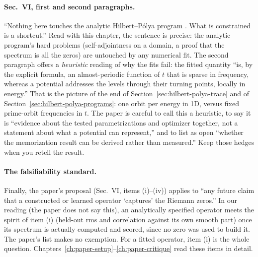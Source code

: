 \paragraph{Sec.~VI, first and second paragraphs.} ``Nothing here touches the analytic Hilbert--P\'olya program \cite{berrykeating99,connes,bbm,zetatriples,connes26}. What is constrained is a shortcut.'' Read with this chapter, the sentence is precise: the analytic program's hard problems (self-adjointness on a domain, a proof that the spectrum is all the zeros) are untouched by any numerical fit. The second paragraph offers a \emph{heuristic} reading of why the fits fail: the fitted quantity ``is, by the explicit formula, an almost-periodic function of $t$ that is sparse in frequency, whereas a potential addresses the levels through their turning points, locally in energy.'' That is the picture of the end of Section~\ref{sec:hilbert-polya-trace} and of Section~\ref{sec:hilbert-polya-programs}: one orbit per energy in 1D, versus fixed prime-orbit frequencies in $t$. The paper is careful to call this a heuristic, to say it is ``evidence about the tested parametrizations and optimizer together, not a statement about what a potential can represent,'' and to list as open ``whether the memorization result can be derived rather than measured.'' Keep those hedges when you retell the result.

\paragraph{The falsifiability standard.} Finally, the paper's proposal (Sec.~VI, items (i)--(iv)) applies to ``any future claim that a constructed or learned operator `captures' the Riemann zeros.'' In our reading (the paper does not say this), an analytically specified operator meets the spirit of item (i) (held-out rms and correlation against its own smooth part) once its spectrum is actually computed and scored, since no zero was used to build it. The paper's list makes no exemption. For a fitted operator, item (i) is the whole question. Chapters~\ref{ch:paper-setup}--\ref{ch:paper-critique} read these items in detail.

